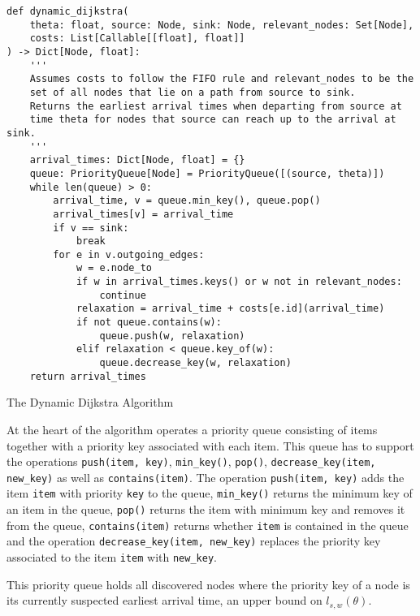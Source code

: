 \begin{algorithm}[h]
\begin{verbatim}
def dynamic_dijkstra(
    theta: float, source: Node, sink: Node, relevant_nodes: Set[Node],
    costs: List[Callable[[float], float]]
) -> Dict[Node, float]:
    '''
    Assumes costs to follow the FIFO rule and relevant_nodes to be the
    set of all nodes that lie on a path from source to sink.
    Returns the earliest arrival times when departing from source at
    time theta for nodes that source can reach up to the arrival at sink.
    '''
    arrival_times: Dict[Node, float] = {}
    queue: PriorityQueue[Node] = PriorityQueue([(source, theta)])
    while len(queue) > 0:
        arrival_time, v = queue.min_key(), queue.pop()
        arrival_times[v] = arrival_time
        if v == sink:
            break
        for e in v.outgoing_edges:
            w = e.node_to
            if w in arrival_times.keys() or w not in relevant_nodes:
                continue
            relaxation = arrival_time + costs[e.id](arrival_time)
            if not queue.contains(w):
                queue.push(w, relaxation)
            elif relaxation < queue.key_of(w):
                queue.decrease_key(w, relaxation)
    return arrival_times
\end{verbatim}
\caption{The Dynamic Dijkstra Algorithm}
\label{alg:dynamic-dijkstra}
\end{algorithm}

At the heart of the algorithm operates a priority queue consisting of items together with a priority key associated with each item.
This queue has to support the operations \texttt{push(item, key)}, \texttt{min\_key()}, \texttt{pop()}, \texttt{decrease\_key(item, new\_key)} as well as \texttt{contains(item)}.
The operation \texttt{push(item, key)} adds the item \texttt{item} with priority \texttt{key} to the queue, \texttt{min\_key()} returns the minimum key of an item in the queue, \texttt{pop()} returns the item with minimum key and removes it from the queue, \texttt{contains(item)} returns whether \texttt{item} is contained in the queue and the operation \texttt{decrease\_key(item, new\_key)} replaces the priority key associated to the item \texttt{item} with \texttt{new\_key}.


This priority queue holds all discovered nodes where the priority key of a node is its currently suspected earliest arrival time, an upper bound on $l_{s,w}(\theta)$.


